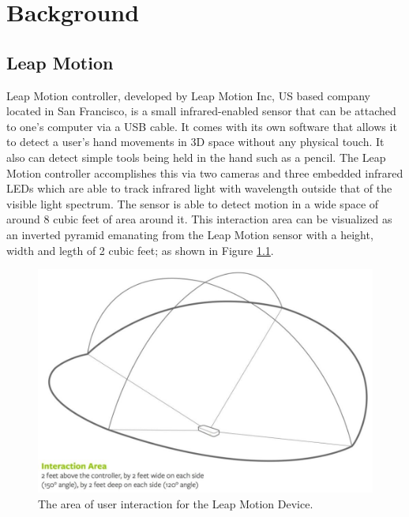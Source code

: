 \chapter{Background}

\label{Chapter1} 

\section{Leap Motion}
Leap Motion controller, developed by Leap Motion Inc, US based company located in San Francisco, is a small infrared-enabled sensor that can be attached to one’s computer via a USB cable. It comes with its own software that allows it to detect a user’s hand movements in 3D space without any physical touch. It also can detect simple tools being held in the hand such as a pencil. The Leap Motion controller accomplishes this via two cameras and three embedded infrared LEDs which are able to track infrared light with wavelength outside that of the visible light spectrum. The sensor is able to detect motion in a wide space of around 8 cubic feet of area around it. This interaction area can be visualized as an inverted pyramid emanating from the Leap Motion sensor with a height, width and legth of 2 cubic feet; as shown in Figure \ref{fig:LeapInteractionArea}.
\begin{figure}[th]
\centering
\includegraphics[scale=0.35]{Figures/LeapInteractionArea.JPG}
\caption{The area of user interaction for the Leap Motion Device.}
\label{fig:LeapInteractionArea}
\end{figure}

